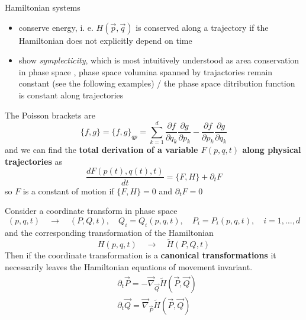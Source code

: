 Hamiltonian systems

\begin{itemize}
\item conserve energy, i. e. $H(\vec{p}, \vec{q})$ is conserved along a trajectory if the Hamiltonian does not explicitly depend on time
\item show \textit{symplecticity}, which is most intuitively understood as area conservation in phase space \citep{Hairer06}, phase space volumina spanned by trajactories remain constant (see the following examples) / the phase space ditribution function is constant along trajectories
\end{itemize}

The Poisson brackets are
\begin{equation}
  \{f, g\}=\{f, g\}_{q p}=\sum_{k=1}^d \frac{\partial f}{\partial q_k} \frac{\partial g}{\partial p_k}-\frac{\partial f}{\partial p_k} \frac{\partial g}{\partial q_k}
\end{equation}
and we can find the \textbf{total derivation of a variable $F(p,q,t)$ along physical trajectories} as
\begin{equation}
  \frac{dF(p(t),q(t),t)}{dt} = \{F, H\} + \partial_t F
\end{equation}
so $F$ is a constant of motion if $\{F, H\} = 0$ and $\partial_t F = 0$

Consider a coordinate transform in phase space
\begin{equation}
  (p,q,t) \quad \rightarrow \quad (P,Q,t), \quad Q_i = Q_i(p,q,t), \quad P_i = P_i(p,q,t), \quad i = 1,\dots,d
\end{equation}
and the corresponding transformation of the Hamiltonian
\begin{equation}
  H(p,q,t) \quad \rightarrow \quad \tilde{H}(P,Q,t)
\end{equation}
Then if the coordinate transformation is a \textbf{canonical transformations} it necessarily leaves the Hamiltonian
equations of movement invariant.
\begin{equation}
  \begin{aligned}
    & \partial_t \vec{P}=-\vec{\nabla}_{\vec{Q}} \tilde{H}(\vec{P},\vec{Q}) \\
    & \partial_t \vec{Q}=\vec{\nabla}_{\vec{P}} \tilde{H}(\vec{P},\vec{Q})
    \end{aligned}
\end{equation}

